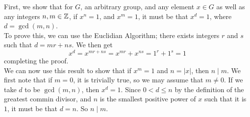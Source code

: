 \documentclass[12pt]{article}
\begin{document}
    First, we show that for $G$, an arbitrary group,
    and any element $x \in G$ as well as any integers $n, m \in \mathbb{Z}$,
    if $x^n = 1$,
    and $x^m = 1$,
    it must be that $x^d = 1$,
    where $d = \gcd(m, n)$. \\ 
    To prove this, we can use the Euclidian Algorithm;
    there exists integers $r$ and $s$ such that $d = mr + ns$.
    We then get
    \[ x^d = x^{mr + ns} = x^{mr} + x^{ns} = 1^r + 1^s = 1 \]
    completing the proof. \\

    We can now use this result to show that
    if $x^m = 1$ and $n = |x|$, then $n \mid m$.
    We first note that if $m = 0$, it is trivially true,
    so we may assume that $m \neq 0$. 
    If we take $d$ to be $\gcd(m, n)$,
    then $x^d = 1$.
    Since $0 < d \leqslant n$
    by the definition of the greatest commin divisor,
    and $n$ is the smallest positive power of $x$ such that it is $1$,
    it must be that $d = n$. So $n \mid m$. \\
    
\end{document}
